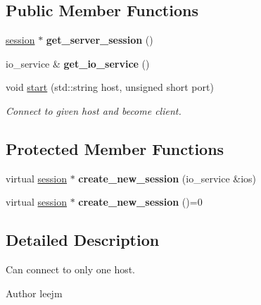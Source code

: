 \subsection*{Public Member Functions}
\begin{DoxyCompactItemize}
\item 
\mbox{\label{classmedianet_1_1client_a5fb534476e728af64b6665e1fc491658}} 
\mbox{\hyperlink{classmedianet_1_1session}{session}} $\ast$ {\bfseries get\+\_\+server\+\_\+session} ()
\item 
\mbox{\label{classmedianet_1_1client_a526b5cce5710dcfb2f63f29a5aaec945}} 
io\+\_\+service \& {\bfseries get\+\_\+io\+\_\+service} ()
\item 
void \mbox{\hyperlink{classmedianet_1_1client_a5700e0893f2771ab6ed5a2e119db35e7}{start}} (std\+::string host, unsigned short port)
\begin{DoxyCompactList}\small\item\em Connect to given host and become client. \end{DoxyCompactList}\end{DoxyCompactItemize}
\subsection*{Protected Member Functions}
\begin{DoxyCompactItemize}
\item 
\mbox{\label{classmedianet_1_1client_a939f2c8b49eddfc7f3fa81a6a91daf60}} 
virtual \mbox{\hyperlink{classmedianet_1_1session}{session}} $\ast$ {\bfseries create\+\_\+new\+\_\+session} (io\+\_\+service \&ios)
\item 
\mbox{\label{classmedianet_1_1network__service__interface_a951d00b17cf7021c2f66d29495b46880}} 
virtual \mbox{\hyperlink{classmedianet_1_1session}{session}} $\ast$ {\bfseries create\+\_\+new\+\_\+session} ()=0
\end{DoxyCompactItemize}


\subsection{Detailed Description}
Can connect to only one host. 

\begin{DoxyAuthor}{Author}
leejm 
\end{DoxyAuthor}


